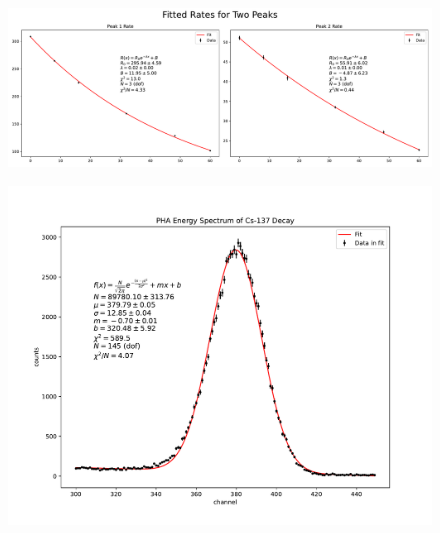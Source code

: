 \documentclass{article}
\begin{document}
\begin{figure}
\centering
\includegraphics[width=1\linewidth]{experiment1/example3/task6.pdf}
\end{figure}

\begin{figure}
\centering
\includegraphics[width=1\linewidth]{experiment1/example4/task3.pdf}
\end{figure}
\end{document}
